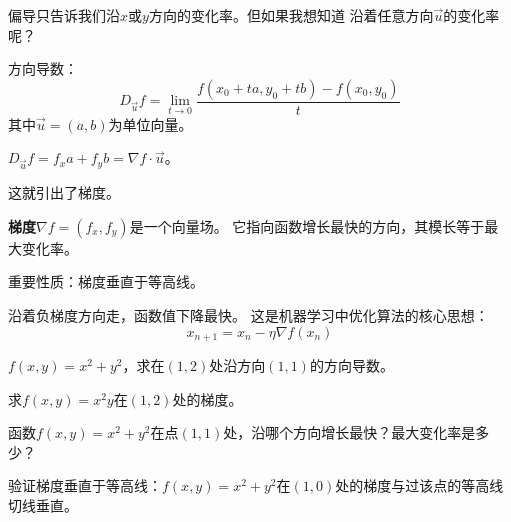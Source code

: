 \documentclass[a4paper,12pt]{ctexart}
\begin{document}
\newpage



偏导只告诉我们沿$x$或$y$方向的变化率。但如果我想知道
沿着任意方向$\vec u$的变化率呢？

方向导数：
\[
D_{\vec u}f = \lim_{t\to0}\frac{f(x_0+ta,y_0+tb)-f(x_0,y_0)}{t}
\]
其中$\vec u=(a,b)$为单位向量。


$D_{\vec u}f = f_x a + f_y b = \nabla f\cdot\vec u$。

这就引出了梯度。


\textbf{梯度}$\nabla f = (f_x,f_y)$是一个向量场。
它指向函数增长最快的方向，其模长等于最大变化率。

重要性质：梯度垂直于等高线。

\begin{center}
\end{center}


沿着负梯度方向走，函数值下降最快。
这是机器学习中优化算法的核心思想：
\[
x_{n+1} = x_n - \eta\nabla f(x_n)
\]


\begin{exercise}
\item $f(x,y)=x^2+y^2$，求在$(1,2)$处沿方向$(1,1)$的方向导数。
\item 求$f(x,y)=x^2y$在$(1,2)$处的梯度。
\item 函数$f(x,y)=x^2+y^2$在点$(1,1)$处，沿哪个方向增长最快？最大变化率是多少？
\item 验证梯度垂直于等高线：$f(x,y)=x^2+y^2$在$(1,0)$处的梯度与过该点的等高线切线垂直。
\end{exercise}

\newpage

\end{document}

